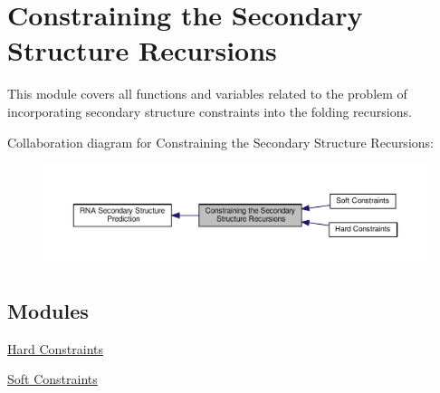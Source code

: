 \hypertarget{group__constraints}{\section{Constraining the Secondary Structure Recursions}
\label{group__constraints}
}


This module covers all functions and variables related to the problem of incorporating secondary structure constraints into the folding recursions.  


Collaboration diagram for Constraining the Secondary Structure Recursions\-:
\nopagebreak
\begin{figure}[H]
\begin{center}
\leavevmode
\includegraphics[width=350pt]{group__constraints}
\end{center}
\end{figure}
\subsection*{Modules}
\begin{DoxyCompactItemize}
\item 
\hyperlink{group__hard__constraints}{Hard Constraints}
\item 
\hyperlink{group__soft__constraints}{Soft Constraints}
\end{DoxyCompactItemize}

